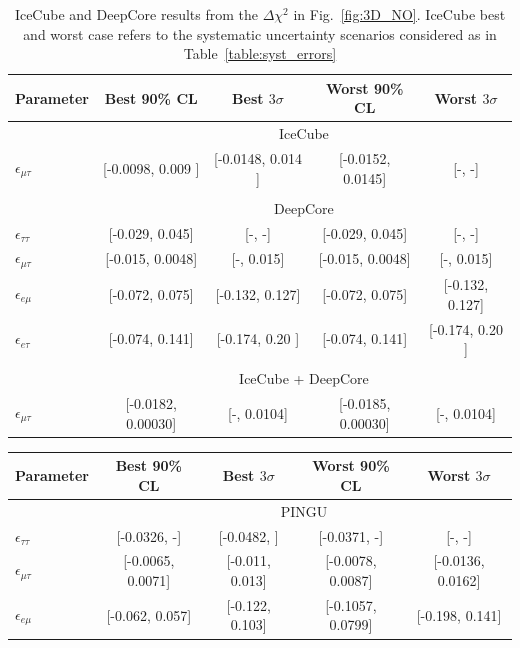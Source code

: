 \documentclass[draft=True]{revtex4-2}
\newcommand{\emt}{\ensuremath{\epsilon_{\mu\tau}}}
\newcommand{\eet}{\epsilon_{e\tau}}
\newcommand{\eem}{\epsilon_{e\mu}}
\newcommand{\ett}{\ensuremath{\epsilon_{\tau\tau}}}
\begin{document}
{%
{\renewcommand{\arraystretch}{1.3}
 \begin{table}
   \begin{center}
   \begin{tabular}{lcccc}
      \hline \hline
      Parameter & Best 90\% CL & Best $3\sigma$ & Worst 90\% CL & Worst $3\sigma$\\
      \hline & \multicolumn{4}{c}{IceCube}  \\
      $\emt$ & [-0.0098, 0.009 ] & [-0.0148, 0.014 ] & [-0.0152, 0.0145] & [-, -] \\\\
      & \multicolumn{4}{c}{DeepCore}  \\[0.3em]
      $\ett$ & [-0.029, 0.045] & [-, -]& [-0.029, 0.045] & [-, -] \\
      $\emt$ & [-0.015, 0.0048] & [-, 0.015]& [-0.015, 0.0048] & [-, 0.015] \\
      $\eem$ & [-0.072, 0.075] & [-0.132, 0.127]& [-0.072, 0.075] & [-0.132, 0.127]\\
      $\eet$ & [-0.074, 0.141] & [-0.174, 0.20  ]& [-0.074, 0.141] & [-0.174, 0.20  ]\\\\
      &\multicolumn{4}{c}{IceCube + DeepCore}  \\
      $\emt$ & [-0.0182,  0.00030] & [-, 0.0104] & [-0.0185, 0.00030] & [-, 0.0104] \\
      \hline
      \hline
   \end{tabular}
   \end{center}
   \caption{IceCube and DeepCore results from the $\Delta \chi^2$ in Fig.~\ref{fig:3D_NO}. IceCube best and worst case refers to 
   the systematic uncertainty scenarios considered as in Table~\ref{table:syst_errors}}\label{table:IC_DC_results}
\end{table}
\begin{table}
   \begin{tabular}{lcccc}
      \hline \hline
      Parameter & Best 90\% CL & Best $3\sigma$ & Worst 90\% CL & Worst $3\sigma$\\
      \hline & \multicolumn{4}{c}{PINGU} \\
      $\ett$ & [-0.0326, -] & [-0.0482, ] & [-0.0371, -] & [-, -] \\
      $\emt$ & [-0.0065, 0.0071] & [-0.011, 0.013] & [-0.0078, 0.0087] & [-0.0136, 0.0162] \\
      $\eem$ & [-0.062, 0.057] & [-0.122, 0.103] & [-0.1057, 0.0799] & [-0.198, 0.141]\\

\end{tabular}
\end{table}}}
\end{document}
